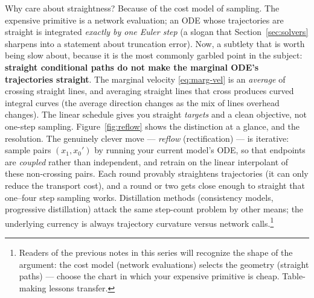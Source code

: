 \documentclass[10pt,a4paper]{article}
\begin{document}
Why care about straightness? Because of the cost model of sampling. The
expensive primitive is a network evaluation; an ODE whose trajectories are
straight is integrated \emph{exactly by one Euler step} (a slogan that
Section~\ref{sec:solvers} sharpens into a statement about truncation
error). Now, a subtlety
that is worth being slow about, because it is the most commonly garbled
point in the subject: \textbf{straight conditional paths do not make the
marginal ODE's trajectories straight}. The marginal velocity
\eqref{eq:marg-vel} is an \emph{average} of crossing straight lines, and
averaging straight lines that cross produces curved integral curves
(the average direction changes as the mix of lines overhead changes). The
linear schedule gives you straight \emph{targets} and a clean objective,
not one-step sampling. Figure~\ref{fig:reflow} shows the distinction at a
glance, and the resolution. The genuinely clever move --- \emph{reflow}
(rectification) --- is iterative: sample pairs $(x_1, x_0')$ by running
your current model's ODE, so that endpoints are \emph{coupled} rather than
independent, and retrain on the linear interpolant of these non-crossing
pairs. Each round provably straightens trajectories (it can only reduce
the transport cost), and a round or two gets close enough to straight that
one--four step sampling works. Distillation methods (consistency models,
progressive distillation) attack the same step-count problem by other
means; the underlying currency is always trajectory curvature versus
network calls.\footnote{Readers of the previous notes in this series will
recognize the shape of the argument: the cost model (network evaluations)
selects the geometry (straight paths) --- choose the chart in which your
expensive primitive is cheap. Table-making lessons transfer.}
\end{document}
